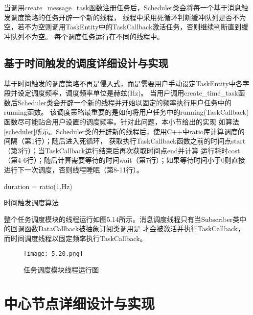 当调用create\_message\_task函数注册任务后，Scheduler类会将每一个基于消息触发调度策略的任务开辟一个新的线程，
线程中采用死循环判断缓冲队列是否不为空，若不为空则调用TaskEntity中的TaskCallback激活任务，否则继续判断直到缓冲队列不为空。
每个调度任务运行在不同的线程中。

\subsection{基于时间触发的调度详细设计与实现}
基于时间触发的调度策略不再是侵入式，而是需要用户手动设定TaskEntity中各字段并设定调度频率，调度频率单位是赫兹(Hz)。
当用户调用create\_time\_task函数后Scheduler类会开辟一个新的线程并开始以固定的频率执行用户任务中的running函数。
该调度策略最重要的是如何将用户任务中的running(TaskCallback)函数尽可能贴合用户设置的调度频率。针对此问题，本小节给出的实现
如算法\ref{scheduler}所示。Scheduler类的开辟新的线程后，使用C++中ratio库计算调度的间隔（第1行）；随后进入死循环，
获取执行TaskCallback函数之前的时间点start（第3行）；当TaskCallback运行结束后再次获取时间点end并计算
运行耗时cost（第4-6行）；随后计算需要等待的时间wait（第7行）；如果等待时间小于0则直接进行下一次调度，否则线程睡眠（第8-11行）。

\begin{algorithm}[H]
  \small
  \SetAlgoLined
  duration = ratio(1,Hz)\;
  \caption{时间触发调度算法}
  \label{scheduler}
\end{algorithm}

整个任务调度模块的线程运行如图5.14所示。消息调度线程只有当Subscriber类中的回调函数DataCallback被抽象订阅类调用是
才会被激活并执行TaskCallback，而时间调度线程以固定频率执行TaskCallback。
\begin{figure}[H]
  \centering
  \texttt{[image: 5.20.png]}
  \caption{任务调度模块线程运行图}
  \label{fig:13}
\end{figure}


\section{中心节点详细设计与实现}



